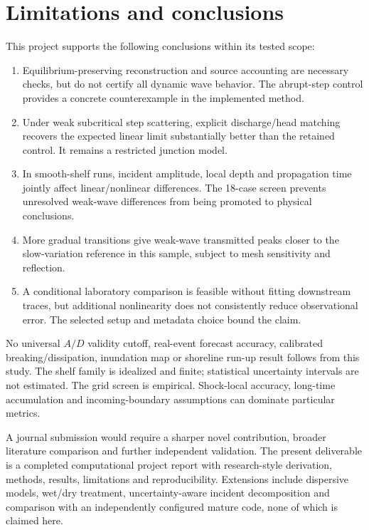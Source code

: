 \documentclass[11pt]{article}
\begin{document}
\section{Limitations and conclusions}
This project supports the following conclusions within its tested scope:
\begin{enumerate}
\item Equilibrium-preserving reconstruction and source accounting are necessary
checks, but do not certify all dynamic wave behavior. The abrupt-step control
provides a concrete counterexample in the implemented method.
\item Under weak subcritical step scattering, explicit discharge/head matching
recovers the expected linear limit substantially better than the retained control.
It remains a restricted junction model.
\item In smooth-shelf runs, incident amplitude, local depth and propagation time
jointly affect linear/nonlinear differences. The 18-case screen prevents
unresolved weak-wave differences from being promoted to physical conclusions.
\item More gradual transitions give weak-wave transmitted peaks closer to the
slow-variation reference in this sample, subject to mesh sensitivity and reflection.
\item A conditional laboratory comparison is feasible without fitting downstream
traces, but additional nonlinearity does not consistently reduce observational
error. The selected setup and metadata choice bound the claim.
\end{enumerate}
No universal $A/D$ validity cutoff, real-event forecast accuracy, calibrated
breaking/dissipation, inundation map or shoreline run-up result follows from this
study. The shelf family is idealized and finite; statistical uncertainty intervals
are not estimated. The grid screen is empirical. Shock-local accuracy, long-time
accumulation and incoming-boundary assumptions can dominate particular metrics.

A journal submission would require a sharper novel contribution, broader
literature comparison and further independent validation. The present deliverable
is a completed computational project report with research-style derivation,
methods, results, limitations and reproducibility. Extensions include dispersive
models, wet/dry treatment, uncertainty-aware incident decomposition and comparison
with an independently configured mature code, none of which is claimed here.

\appendix
\end{document}
